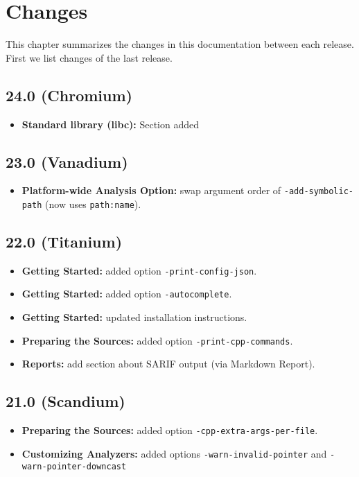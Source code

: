 \chapter{Changes}\label{chap:changes}

This chapter summarizes the changes in this documentation between each \FramaC
release. First we list changes of the last release.

\section*{24.0 (Chromium)}
\begin{itemize}
\item \textbf{Standard library (libc):} Section added
\end{itemize}

\section*{23.0 (Vanadium)}

\begin{itemize}
\item \textbf{Platform-wide Analysis Option:} swap argument order of
  \texttt{-add-symbolic-path} (now uses \texttt{path:name}).
\end{itemize}

\section*{22.0 (Titanium)}

\begin{itemize}
\item \textbf{Getting Started:} added option
  \texttt{-print-config-json}.
\item \textbf{Getting Started:} added option
  \texttt{-autocomplete}.
\item \textbf{Getting Started:} updated installation instructions.
\item \textbf{Preparing the Sources:} added option
  \texttt{-print-cpp-commands}.
\item \textbf{Reports:} add section about SARIF output
  (via \textsf{Markdown Report}).
\end{itemize}

\section*{21.0 (Scandium)}

\begin{itemize}
\item \textbf{Preparing the Sources:} added option
  \texttt{-cpp-extra-args-per-file}.
\item \textbf{Customizing Analyzers:} added options
  \texttt{-warn-invalid-pointer} and \texttt{-warn-pointer-downcast}
\end{itemize}

